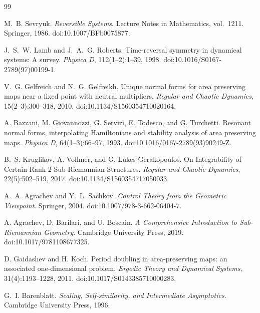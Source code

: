 \begin{thebibliography}{99}

M.~B. Sevryuk.
\newblock \emph{Reversible Systems}.
\newblock Lecture Notes in Mathematics, vol.~1211. Springer, 1986.
\newblock doi:10.1007/BFb0075877.

J.~S.~W. Lamb and J.~A.~G. Roberts.
\newblock Time-reversal symmetry in dynamical systems: A survey.
\newblock \emph{Physica D}, 112(1--2):1--39, 1998.
\newblock doi:10.1016/S0167-2789(97)00199-1.

V.~G. Gelfreich and N.~G. Gelfreikh.
\newblock Unique normal forms for area preserving maps near a fixed point with neutral multipliers.
\newblock \emph{Regular and Chaotic Dynamics}, 15(2--3):300--318, 2010.
\newblock doi:10.1134/S1560354710020164.

A. Bazzani, M. Giovannozzi, G. Servizi, E. Todesco, and G. Turchetti.
\newblock Resonant normal forms, interpolating Hamiltonians and stability analysis of area preserving maps.
\newblock \emph{Physica D}, 64(1--3):66--97, 1993.
\newblock doi:10.1016/0167-2789(93)90249-Z.

B.~S. Kruglikov, A. Vollmer, and G. Lukes-Gerakopoulos.
\newblock On Integrability of Certain Rank 2 Sub-Riemannian Structures.
\newblock \emph{Regular and Chaotic Dynamics}, 22(5):502--519, 2017.
\newblock doi:10.1134/S1560354717050033.

A.~A. Agrachev and Y.~L. Sachkov.
\newblock \emph{Control Theory from the Geometric Viewpoint}.
\newblock Springer, 2004.
\newblock doi:10.1007/978-3-662-06404-7.

A. Agrachev, D. Barilari, and U. Boscain.
\newblock \emph{A Comprehensive Introduction to Sub-Riemannian Geometry}.
\newblock Cambridge University Press, 2019.
\newblock doi:10.1017/9781108677325.

D. Gaidashev and H. Koch.
\newblock Period doubling in area-preserving maps: an associated one-dimensional problem.
\newblock \emph{Ergodic Theory and Dynamical Systems}, 31(4):1193--1228, 2011.
\newblock doi:10.1017/S0143385710000283.

G.~I. Barenblatt.
\newblock \emph{Scaling, Self-similarity, and Intermediate Asymptotics}.
\newblock Cambridge University Press, 1996.

\end{thebibliography}
